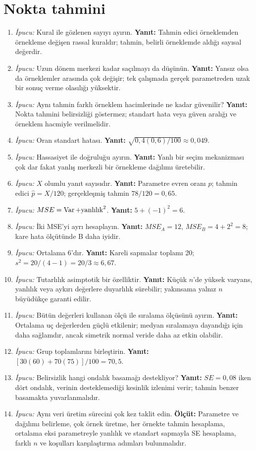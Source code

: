 \section{Nokta tahmini}

\begin{enumerate}[leftmargin=*,itemsep=5pt]
\item \emph{İpucu:} Kural ile gözlenen sayıyı ayırın.
\textbf{Yanıt:} Tahmin edici örneklemden örnekleme değişen rassal kuraldır;
tahmin, belirli örneklemde aldığı sayısal değerdir.
\item \emph{İpucu:} Uzun dönem merkezi kadar saçılmayı da düşünün.
\textbf{Yanıt:} Yansız olsa da örneklemler arasında çok değişir; tek çalışmada
gerçek parametreden uzak bir sonuç verme olasılığı yüksektir.
\item \emph{İpucu:} Aynı tahmin farklı örneklem hacimlerinde ne kadar güvenilir?
\textbf{Yanıt:} Nokta tahmini belirsizliği göstermez; standart hata veya güven
aralığı ve örneklem hacmiyle verilmelidir.
\item \emph{İpucu:} Oran standart hatası.
\textbf{Yanıt:} $\sqrt{0{,}4(0{,}6)/100}\approx0{,}049$.
\item \emph{İpucu:} Hassasiyet ile doğruluğu ayırın.
\textbf{Yanıt:} Yanlı bir seçim mekanizması çok dar fakat yanlış merkezli bir
örnekleme dağılımı üretebilir.
\item \emph{İpucu:} $X$ olumlu yanıt sayısıdır.
\textbf{Yanıt:} Parametre evren oranı $p$; tahmin edici $\hat p=X/120$;
gerçekleşmiş tahmin $78/120=0{,}65$.
\item \emph{İpucu:} $MSE=\operatorname{Var}+\text{yanlılık}^2$.
\textbf{Yanıt:} $5+(-1)^2=6$.
\item \emph{İpucu:} İki MSE'yi ayrı hesaplayın.
\textbf{Yanıt:} $MSE_A=12$, $MSE_B=4+2^2=8$; kare hata ölçütünde B daha iyidir.
\item \emph{İpucu:} Ortalama 6'dır.
\textbf{Yanıt:} Kareli sapmalar toplamı 20; $s^2=20/(4-1)=20/3\approx6{,}67$.
\item \emph{İpucu:} Tutarlılık asimptotik bir özelliktir.
\textbf{Yanıt:} Küçük $n$'de yüksek varyans, yanlılık veya aykırı değerlere
duyarlılık sürebilir; yakınsama yalnız $n$ büyüdükçe garanti edilir.
\item \emph{İpucu:} Bütün değerleri kullanan ölçü ile sıralama ölçüsünü ayırın.
\textbf{Yanıt:} Ortalama uç değerlerden güçlü etkilenir; medyan sıralamaya
dayandığı için daha sağlamdır, ancak simetrik normal veride daha az etkin olabilir.
\item \emph{İpucu:} Grup toplamlarını birleştirin.
\textbf{Yanıt:} $[30(60)+70(75)]/100=70{,}5$.
\item \emph{İpucu:} Belirsizlik hangi ondalık basamağı destekliyor?
\textbf{Yanıt:} $SE=0{,}08$ iken dört ondalık, verinin desteklemediği kesinlik
izlenimi verir; tahmin benzer basamakta yuvarlanmalıdır.
\item \emph{İpucu:} Aynı veri üretim sürecini çok kez taklit edin.
\textbf{Ölçüt:} Parametre ve dağılımı belirleme, çok örnek üretme, her örnekte
tahmin hesaplama, ortalama eksi parametreyle yanlılık ve standart sapmayla SE
hesaplama, farklı $n$ ve koşulları karşılaştırma adımları bulunmalıdır.
\end{enumerate}

